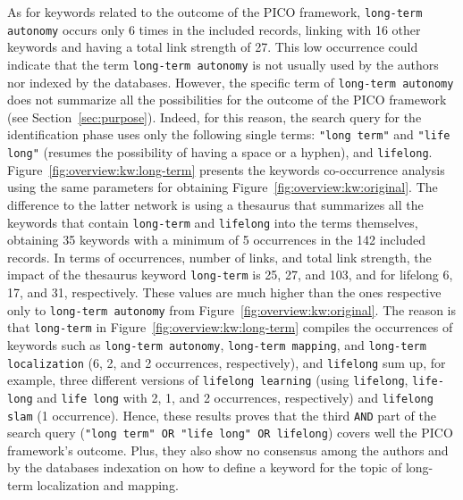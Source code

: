 As for keywords related to the outcome of the PICO framework, \texttt{long-term autonomy} occurs only 6 times in the included records, linking with 16 other keywords and having a total link strength of 27. This low occurrence could indicate that the term \texttt{long-term autonomy} is not usually used by the authors nor indexed by the databases. 
However, the specific term of \texttt{long-term autonomy} does not summarize all the possibilities for the outcome of the PICO framework (see Section~\ref{sec:purpose}). Indeed, for this reason, the search query for the identification phase uses only the following single terms: \texttt{"long term"} and \texttt{"life long"} (resumes the possibility of having a space or a hyphen), and \texttt{lifelong}.
Figure~\ref{fig:overview:kw:long-term} presents the keywords co-occurrence analysis using the same parameters for obtaining Figure~\ref{fig:overview:kw:original}. The difference to the latter network is using a thesaurus that summarizes all the keywords that contain \texttt{long-term} and \texttt{lifelong} into the terms themselves, obtaining 35 keywords with a minimum of 5 occurrences in the 142 included records.
In terms of occurrences, number of links, and total link strength, the impact of the thesaurus keyword \texttt{long-term} is 25, 27, and 103, and for lifelong 6, 17, and 31, respectively. These values are much higher than the ones respective only to \texttt{long-term autonomy} from Figure~\ref{fig:overview:kw:original}.
The reason is that \texttt{long-term} in Figure~\ref{fig:overview:kw:long-term} compiles the occurrences of keywords such as \texttt{long-term autonomy}, \texttt{long-term mapping}, and \texttt{long-term localization} (6, 2, and 2 occurrences, respectively), and \texttt{lifelong} sum up, for example, three different versions of \texttt{lifelong learning} (using \texttt{lifelong}, \texttt{life-long} and \texttt{life long} with 2, 1, and 2 occurrences, respectively) and \texttt{lifelong slam} (1 occurrence). Hence, these results proves that the third \texttt{AND} part of the search query (\texttt{"long term" OR "life long" OR lifelong}) covers well the PICO framework's outcome. Plus, they also show no consensus among the authors and by the databases indexation on how to define a keyword for the topic of long-term localization and mapping.


